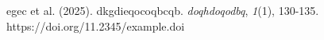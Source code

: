 \documentclass[11pt]{article}
\begin{document}
\fontsize{11pt}{13.2pt}\selectfont
egec et al. (2025). dkgdieqocoqbcqb. \textit{doqhdoqodbq}, \textit{1}(1), 130-135. https://doi.org/11.2345/example.doi
\end{document}
